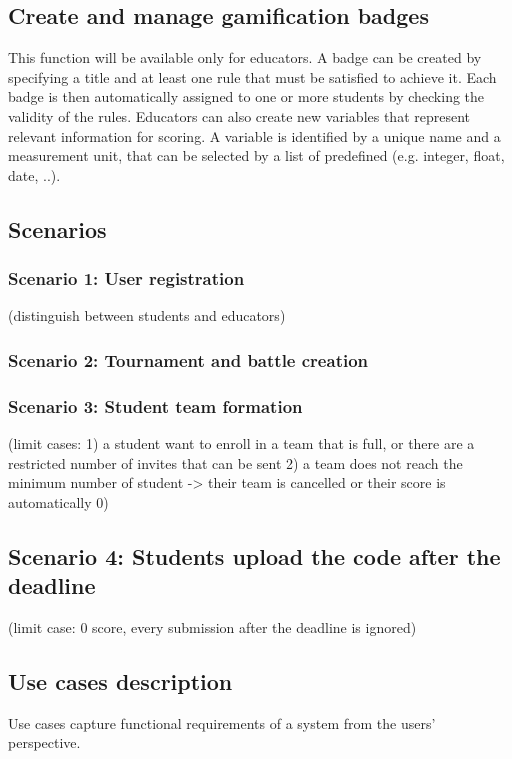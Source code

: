 \subsection{Create and manage gamification badges}
This function will be available only for educators. \newline A badge can be created by specifying a title and at least one rule that must be satisfied to achieve it. Each badge is then automatically assigned to one or more students by checking the validity of the rules.
Educators can also create new variables that represent relevant information for scoring. A variable is identified by a unique name and a measurement unit, that can be selected by a list of predefined (e.g. integer, float, date, ..).

\clearpage

\subsection{Scenarios}
\subsubsection{Scenario 1: User registration}\label{sc:first}
(distinguish between students and educators)
\subsubsection{Scenario 2: Tournament and battle creation}\label{sc:second}
\subsubsection{Scenario 3: Student team formation}\label{sc:third}
(limit cases: 1) a student want to enroll in a team that is full, or there are a restricted number of invites that can be sent 2) a team does not reach the minimum number of student -> their team is cancelled or their score is automatically 0)
\subsection{Scenario 4: Students upload the code after the deadline}\label{sc:fourth}
(limit case: 0 score, every submission after the deadline is ignored)

\clearpage
\subsection{Use cases description}
Use cases capture functional requirements of a system from the users' perspective.

